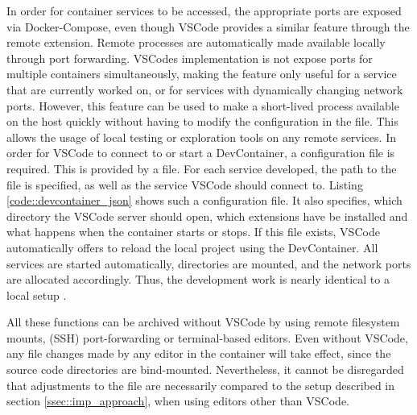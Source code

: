         In order for container services to be accessed, the appropriate ports are exposed via Docker-Compose, even though \ac{VSCode} provides a similar feature through the remote extension. Remote processes are automatically made available locally through port forwarding. \ac{VSCode}s implementation is not expose ports for multiple containers simultaneously, making the feature only useful for a service that are currently worked on, or for services with dynamically changing network ports. However, this feature can be used to make a short-lived process available on the host quickly without having to modify the configuration in the  file. This allows the usage of local testing or exploration tools on any remote services.\newline
        In order for \ac{VSCode} to connect to or start a DevContainer, a configuration file is required. This is provided by a  file. For each service developed, the path to the  file is specified, as well as the service \ac{VSCode} should connect to. Listing \ref{code::devcontainer_json} shows such a configuration file. It also specifies, which directory the \ac{VSCode} server should open, which extensions have be installed and what happens when the container starts or stops. If this file exists, \ac{VSCode} automatically offers to reload the local project using the DevContainer. All services are started automatically, directories are mounted, and the network ports are allocated accordingly. Thus, the development work is nearly identical to a local setup \cite{vscodedevcontainer}.\newline
        
        All these functions can be archived without \ac{VSCode} by using remote filesystem mounts, (\ac{SSH}) port-forwarding or terminal-based editors. Even without VSCode, any file changes made by any editor in the container will take effect, since the source code directories are bind-mounted. Nevertheless, it cannot be disregarded that adjustments to the  file are necessarily compared to the setup described in section \ref{ssec::imp_approach}, when using editors other than \ac{VSCode}.

